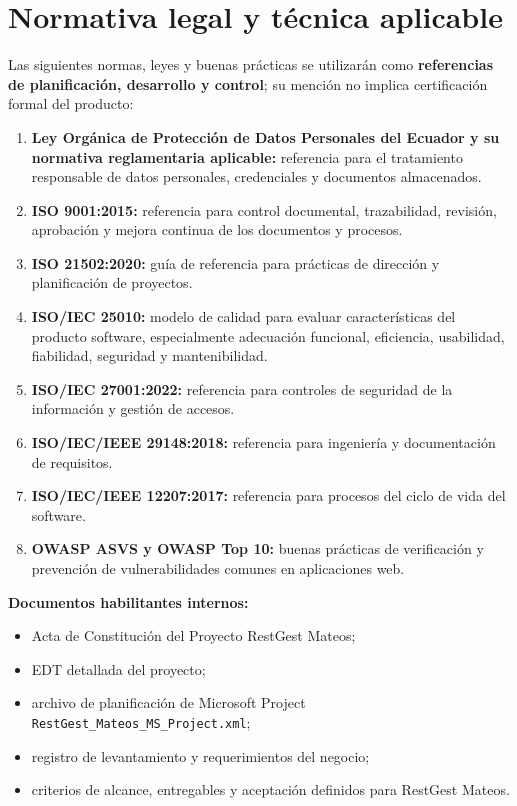\documentclass[12pt,a4paper]{article}
\begin{document}
\section{Normativa legal y técnica aplicable}

Las siguientes normas, leyes y buenas prácticas se utilizarán como \textbf{referencias de planificación, desarrollo y control}; su mención 
no implica certificación formal del producto:

\begin{enumerate}
    \item \textbf{Ley Orgánica de Protección de Datos Personales del Ecuador y su normativa reglamentaria aplicable:} referencia para el tratamiento responsable de datos personales, credenciales y documentos almacenados.
    \item \textbf{ISO 9001:2015:} referencia para control documental, trazabilidad, revisión, aprobación y mejora continua de los documentos y procesos.
    \item \textbf{ISO 21502:2020:} guía de referencia para prácticas de dirección y planificación de proyectos.
    \item \textbf{ISO/IEC 25010:} modelo de calidad para evaluar características del producto software, especialmente adecuación funcional, eficiencia, usabilidad, fiabilidad, seguridad y mantenibilidad.
    \item \textbf{ISO/IEC 27001:2022:} referencia para controles de seguridad de la información y gestión de accesos.
    \item \textbf{ISO/IEC/IEEE 29148:2018:} referencia para ingeniería y documentación de requisitos.
    \item \textbf{ISO/IEC/IEEE 12207:2017:} referencia para procesos del ciclo de vida del software.
    \item \textbf{OWASP ASVS y OWASP Top 10:} buenas prácticas de verificación y prevención de vulnerabilidades comunes en aplicaciones web.
\end{enumerate}

\textbf{Documentos habilitantes internos:}

\begin{itemize}
    \item Acta de Constitución del Proyecto RestGest Mateos;
    \item EDT detallada del proyecto;
    \item archivo de planificación de Microsoft Project \texttt{RestGest\_Mateos\_MS\_Project.xml};
    \item registro de levantamiento y requerimientos del negocio;
    \item criterios de alcance, entregables y aceptación definidos para RestGest Mateos.
\end{itemize}
\end{document}
